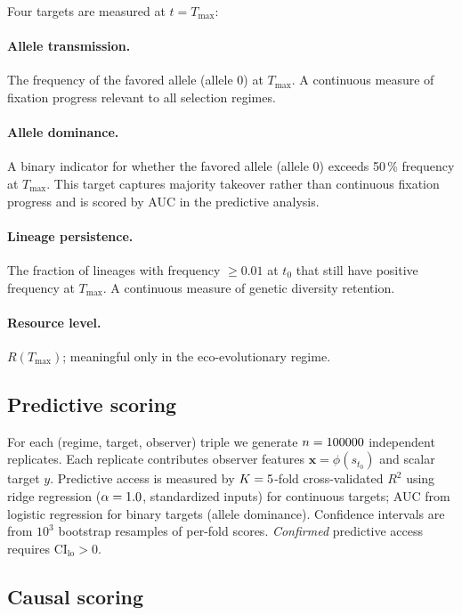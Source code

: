 \documentclass[11pt,a4paper]{article}
\newcommand{\Tfin}{T_{\max}}
\begin{document}
Four targets are measured at $t = \Tfin$:

\paragraph{Allele transmission.}
The frequency of the favored allele (allele 0) at $\Tfin$.
A continuous measure of fixation progress relevant to all selection regimes.

\paragraph{Allele dominance.}
A binary indicator for whether the favored allele (allele 0) exceeds
50\,\% frequency at $\Tfin$.
This target captures majority takeover rather than continuous fixation
progress and is scored by AUC in the predictive analysis.

\paragraph{Lineage persistence.}
The fraction of lineages with frequency $\geq 0.01$ at $t_0$ that
still have positive frequency at $\Tfin$.
A continuous measure of genetic diversity retention.

\paragraph{Resource level.}
$R(\Tfin)$; meaningful only in the eco-evolutionary regime.

\subsection{Predictive scoring}
\label{sec:pred}

For each (regime, target, observer) triple we generate $n = 100000$ independent
replicates.
Each replicate contributes observer features $\bm{x} = \phi(s_{t_0})$
and scalar target $y$.
Predictive access is measured by $K = 5$-fold cross-validated $R^2$
using ridge regression ($\alpha = 1.0$, standardized inputs)
for continuous targets; AUC from logistic regression for binary targets
(allele dominance).
Confidence intervals are from $10^3$ bootstrap resamples of per-fold scores.
\emph{Confirmed} predictive access requires $\mathrm{CI}_\mathrm{lo} > 0$.

\subsection{Causal scoring}
\label{sec:caus}
\end{document}
